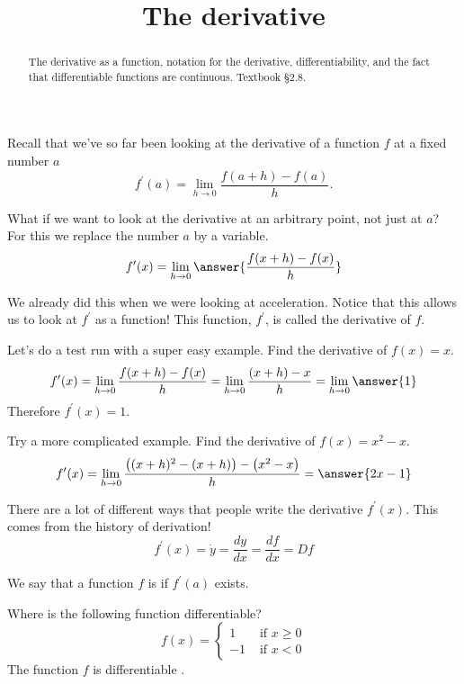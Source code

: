 \documentclass{ximera}
\title{The derivative}
\begin{document}
\begin{abstract}
The derivative as a function, notation for the derivative, differentiability, and the fact that differentiable functions are continuous. Textbook §2.8.
\end{abstract}
\maketitle

Recall that we've so far been looking at the derivative of a function $f$ at a fixed number $a$
\[
f^{\prime}(a)=\lim _{h \rightarrow 0} \frac{f(a+h)-f(a)}{h} .
\]

What if we want to look at the derivative at an arbitrary point, not just at $a$? For this we replace the number $a$ by a variable.
\[
f^{\prime}(x)=\lim _{h \rightarrow 0}\answer{\frac{f(x+h)-f(x)}{h}}
\]

We already did this when we were looking at acceleration. Notice that this allows us to look at $f^{\prime}$ as a function! This function, $f^{\prime}$, is called the derivative of $f$.

\begin{example}\label{example:4-14}
Let's do a test run with a super easy example. Find the derivative of $f(x)=x$.
\[
f^{\prime}(x)=\lim _{h \rightarrow 0}\frac{f(x+h)-f(x)}{h}=\lim _{h \rightarrow 0}\frac{(x+h)-x}{h}=\lim _{h \rightarrow 0}\answer{1}
\]
Therefore $f^{\prime}(x)=1$.
\end{example}

\begin{exercise}\label{exercise:4-15}
Try a more complicated example. Find the derivative of $f(x)=x^{2}-x$.
\[
f^{\prime}(x)=\lim _{h \rightarrow 0}\frac{\left((x+h)^{2}-(x+h)\right)-\left(x^{2}-x\right)}{h}=\answer{2x-1}
\]
\end{exercise}

There are a lot of different ways that people write the derivative $f^{\prime}(x)$. This comes from the history of derivation!
\[
f^{\prime}(x)=\dot{y}=\frac{d y}{d x}=\frac{d f}{d x}=D f
\]

\begin{definition}\label{definition:4-16}
We say that a function $f$ is  if $f^{\prime}(a)$ exists.
\end{definition}

\begin{example}\label{example:4-17}
Where is the following function differentiable?
\[
f(x)= \begin{cases}1 & \text { if } x \geq 0 \\ -1 & \text { if } x<0\end{cases}
\]
The function $f$ is differentiable .
\end{example}
\end{document}
